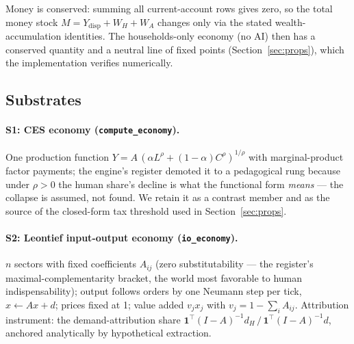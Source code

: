 \documentclass[11pt]{article}
\begin{document}
Money is conserved: summing all current-account rows gives zero, so the total
money stock $M = Y_{\mathrm{disp}} + W_H + W_A$ changes only via the stated
wealth-accumulation identities. The households-only economy (no AI) then has a
conserved quantity and a neutral line of fixed points
(Section~\ref{sec:props}), which the implementation verifies numerically.

\subsection{Substrates}\label{sec:substrates}

\paragraph{S1: CES economy (\texttt{compute\_economy}).} One production
function $Y = A\,(\alpha L^{\rho} + (1-\alpha)C^{\rho})^{1/\rho}$ with
marginal-product factor payments; the engine's register demoted it to a
pedagogical rung because under $\rho > 0$ the human share's decline is what
the functional form \emph{means} --- the collapse is assumed, not found. We
retain it as a contrast member and as the source of the closed-form tax
threshold used in Section~\ref{sec:props}.

\paragraph{S2: Leontief input-output economy (\texttt{io\_economy}).}
$n$ sectors with fixed coefficients $A_{ij}$ (zero substitutability --- the
register's maximal-complementarity bracket, the world most favorable to human
indispensability); output follows orders by one Neumann step per tick,
$x \leftarrow Ax + d$; prices fixed at 1; value added $v_j x_j$ with
$v_j = 1 - \sum_i A_{ij}$. Attribution instrument: the demand-attribution
share $\mathbf{1}^{\top}(I-A)^{-1}d_H \,/\, \mathbf{1}^{\top}(I-A)^{-1}d$,
anchored analytically by hypothetical extraction.
\end{document}
